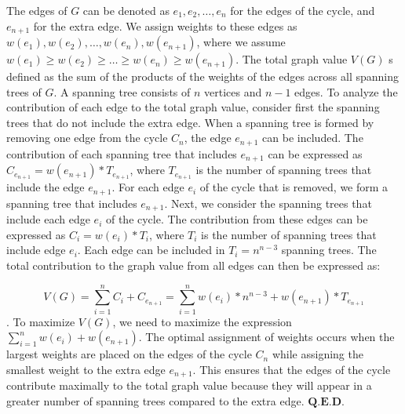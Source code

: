 \documentclass{article}
\begin{document}
The edges of $G$ can be denoted as $e_{1},e_{2},\hdots,e_{n}$ for the edges of the cycle, and $e_{n+1}$ for the extra edge. We assign weights to these edges as $w(e_{1}),w(e_{2}),\hdots,w(e_{n}),w(e_{n+1})$, where we assume $w(e_{1})\geq w(e_{2})\geq \hdots\geq w(e_{n})\geq w(e_{n+1})$. The total graph value $V(G)$ s defined as the sum of the products of the weights of the edges across all spanning trees of $G$. A spanning tree consists of $n$ vertices and $n-1$ edges. To analyze the contribution of each edge to the total graph value, consider first the spanning trees that do not include the extra edge. When a spanning tree is formed by removing one edge from the cycle $C_{n}$, the edge $e_{n+1}$ can be included. The contribution of each spanning tree that includes $e_{n+1}$ can be expressed as $C_{e_{n+1}}=w(e_{n+1})* T_{e_{n+1}}$, where $ T_{e_{n+1}}$ is the number of spanning trees that include the edge $e_{n+1}$. For each edge $e_{i}$ of the cycle that is removed, we form a spanning tree that includes $e_{n+1}$. Next, we consider the spanning trees that include each edge $e_{i}$ of the cycle. The contribution from these edges can be expressed as $C_{i}=w(e_{i})*T_{i}$, where $T_{i}$ is the number of spanning trees that include edge $e_{i}$. Each edge can be included in $T_{i}=n^{n-3}$ spanning trees. The total contribution to the graph value from all edges can then be expressed as:

$$V(G)=\sum_{i=1}^{n}C_{i}+C_{e_{n+1}}=\sum_{i=1}^{n}w(e_{i})*n^{n-3}+w(e_{n+1})*T_{e_{n+1}}$$.
To maximize $V(G)$, we need to maximize the expression $\sum_{i=1}^{n}w(e_{i})+w(e_{n+1})$. The optimal assignment of weights occurs when the largest weights are placed on the edges of the cycle $C_{n}$ while assigning the smallest weight to the extra edge $e_{n+1}$. This ensures that the edges of the cycle contribute maximally to the total graph value because they will appear in a greater number of spanning trees compared to the extra edge. $\textbf{Q.E.D.}$
\end{document}
